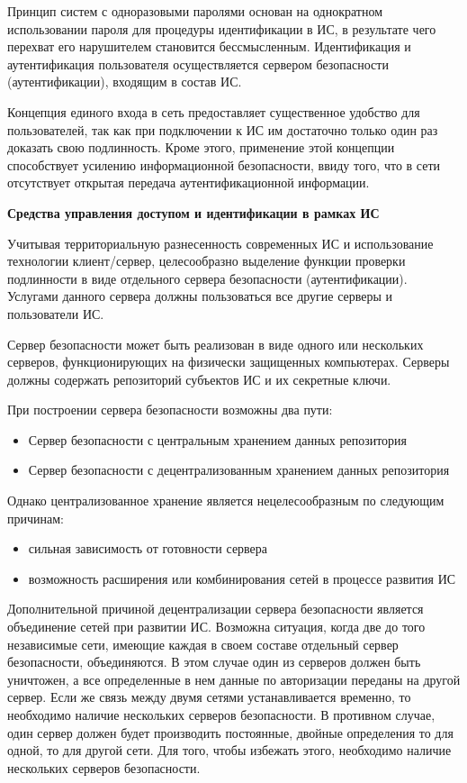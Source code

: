 Принцип систем с одноразовыми паролями основан на однократном использовании пароля для процедуры
идентификации в ИС, в результате чего перехват его нарушителем становится бессмысленным.
Идентификация и аутентификация пользователя осуществляется сервером безопасности (аутентификации), входящим в состав ИС.

Концепция единого входа в сеть предоставляет существенное удобство для пользователей, так как при
подключении к ИС им достаточно только один раз доказать свою подлинность. Кроме этого, применение
этой концепции способствует усилению информационной безопасности, ввиду того, что в сети
отсутствует открытая передача аутентификационной информации.

\bigbreak
\textbf{Средства управления доступом и идентификации в рамках ИС}

Учитывая территориальную разнесенность современных ИС и использование технологии клиент/сервер, целесообразно выделение функции проверки подлинности в виде отдельного сервера безопасности (аутентификации). Услугами данного сервера должны пользоваться все другие серверы и пользователи ИС.

Сервер безопасности может быть реализован в виде одного или нескольких серверов, функционирующих на физически защищенных компьютерах. Серверы должны содержать репозиторий субъектов ИС и их секретные ключи.

При построении сервера безопасности возможны два пути:
\begin{itemize}
    \item Сервер безопасности с центральным хранением данных репозитория
    \item Сервер безопасности с децентрализованным хранением данных репозитория
\end{itemize}

Однако централизованное хранение является нецелесообразным по следующим причинам:
\begin{itemize}
    \item сильная зависимость от готовности сервера
    \item возможность расширения или комбинирования сетей в процессе развития ИС
\end{itemize}

Дополнительной причиной децентрализации сервера безопасности является объединение сетей при развитии ИС. Возможна ситуация, когда две до того независимые сети, имеющие каждая в своем составе отдельный сервер безопасности, объединяются. В этом случае один из серверов должен быть уничтожен, а все определенные в нем данные по авторизации переданы на другой сервер. Если же связь между двумя сетями устанавливается временно, то необходимо наличие нескольких серверов безопасности. В противном случае, один сервер должен будет производить постоянные, двойные определения то для одной, то для другой сети. Для того, чтобы избежать этого, необходимо наличие нескольких серверов безопасности.

